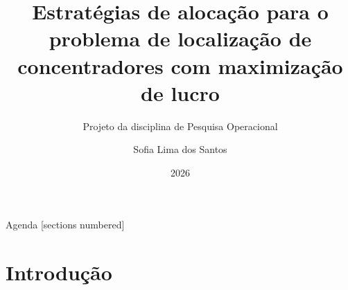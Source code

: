 \documentclass[aspectratio=169, 10pt]{beamer}
\title{Estratégias de alocação para o problema de localização de concentradores com maximização de lucro}
\subtitle{Projeto da disciplina de Pesquisa Operacional}
\author{Sofia Lima dos Santos}
\institute{Instituto Federal Catarinense -- \textit{Campus} Blumenau}
\date{2026}
\begin{document}
\maketitle

\begin{frame}{Agenda}
  [sections numbered]
  \tableofcontents[hideallsubsections]
\end{frame}

\section{Introdução}
\end{document}
